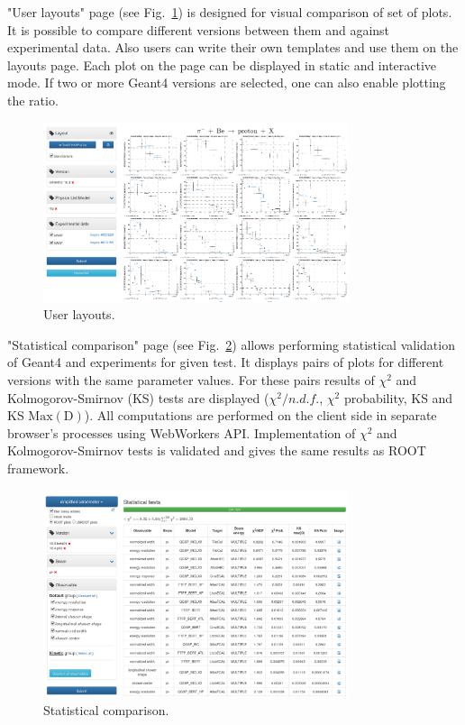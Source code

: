 "User layouts" page (see Fig.~\ref{fig:layouts}) is designed for visual comparison of set of plots. It is possible to compare different versions between them and against experimental data. Also users can write their own templates and use them on the layouts page. Each plot on the page can be displayed in static and interactive mode. If two or more Geant4 versions are selected, one can also enable plotting the ratio.

\begin{figure}[h]
    \centering
    \includegraphics[width=0.8\textwidth,clip]{layouts.png}
    \caption{User layouts.}
    \label{fig:layouts}
\end{figure}

"Statistical comparison" page (see Fig.~\ref{fig:statcomparison}) allows performing statistical validation of Geant4 and experiments for given test. It displays pairs of plots for different versions with the same parameter values. For these pairs results of $\chi^2$ and Kolmogorov-Smirnov (KS) tests are displayed ($\chi^2/n.d.f.$, $\chi^2$ probability, KS and KS $\mathrm{Max(D)}$). All computations are performed on the client side in separate browser's processes using WebWorkers API. Implementation of $\chi^2$ and Kolmogorov-Smirnov tests is validated and gives the same results as ROOT framework.

\begin{figure}[h]
    \centering
    \includegraphics[width=0.8\textwidth,clip]{statcomparison.png}
    \caption{Statistical comparison.}
    \label{fig:statcomparison}
\end{figure}

